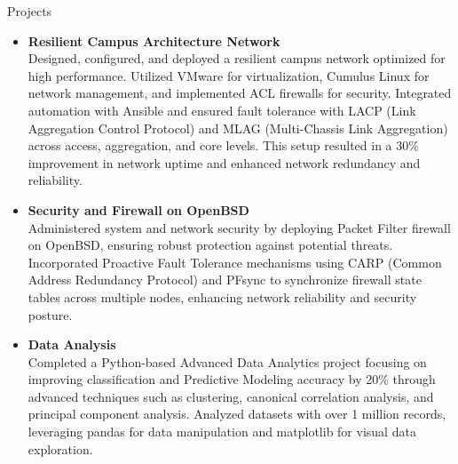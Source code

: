 \documentclass{resume}
\begin{document}
\begin{rSection}{Projects}
\begin{itemize}[leftmargin=*,label= ]
    \item \textbf{\large Resilient Campus Architecture Network} \\    \tab  Designed, configured, and deployed a resilient campus network optimized for high performance. Utilized VMware for virtualization, Cumulus Linux for network management, and implemented ACL firewalls for security. Integrated automation with Ansible and ensured fault tolerance with LACP (Link Aggregation Control Protocol) and MLAG (Multi-Chassis Link Aggregation) across access, aggregation, and core levels. This setup resulted in a 30\% improvement in network uptime and enhanced network redundancy and reliability.
    
    \item \textbf{\large Security and Firewall on OpenBSD} \\     \tab  Administered system and network security by deploying Packet Filter firewall on OpenBSD, ensuring robust protection against potential threats. Incorporated Proactive Fault Tolerance mechanisms using CARP (Common Address Redundancy Protocol) and PFsync to synchronize firewall state tables across multiple nodes, enhancing network reliability and security posture.
    
    \item \textbf{\large Data Analysis} \\     \tab Completed a Python-based Advanced Data Analytics project focusing on improving classification and Predictive Modeling accuracy by 20\% through advanced techniques such as clustering, canonical correlation analysis, and principal component analysis. Analyzed datasets with over 1 million records, leveraging pandas for data manipulation and matplotlib for visual data exploration.
\end{itemize}
\end{rSection} 
\vspace{-0.75em}
\end{document}
